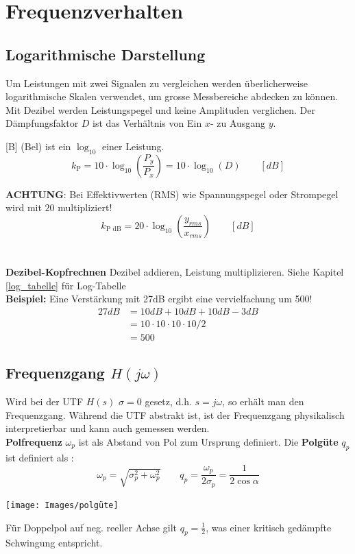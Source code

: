 \section{Frequenzverhalten}
\subsection{Logarithmische Darstellung}
Um Leistungen mit zwei Signalen zu vergleichen werden überlicherweise logarithmische Skalen verwendet, um grosse Messbereiche abdecken zu können. Mit Dezibel werden Leistungspegel und keine Amplituden verglichen. Der Dämpfungsfaktor $D$ ist das Verhältnis von Ein $x$- zu Ausgang $y$.

[B] (Bel) ist ein $\log_{10}$ einer Leistung.
\[k_{\text{P}} = 10 \cdot \log_{10}\left(\frac{P_y}{P_x}\right) = 10 \cdot \log_{10}(D) \qquad [dB]\]

\textbf{ACHTUNG}: Bei Effektivwerten (RMS) wie Spannungspegel oder Strompegel wird mit $20$ multipliziert!
\[k_{\text{P dB}} = 20 \cdot \log_{10}\left(\frac{y_{rms}}{x_{rms}}\right) \qquad [dB]\]
~\\~\\
\textbf{Dezibel-Kopfrechnen}
Dezibel addieren, Leistung multiplizieren. Siehe Kapitel \ref{log_tabelle} für Log-Tabelle
~\\

\noindent\textbf{Beispiel:} Eine Verstärkung mit 27dB ergibt eine vervielfachung um 500!
\begin{align*}
	27dB &= 10dB + 10dB +10dB - 3dB \\
	&= 10 \cdot 10 \cdot 10 \cdot 10 / 2 \\
	&= 500
\end{align*}

\subsection{Frequenzgang $H(j\omega)$}\label{frequenzgang}
Wird bei der UTF $H(s)$ $\sigma = 0$ gesetz, d.h. $s=j\omega$, so erhält man den Frequenzgang. Während die UTF abstrakt ist, ist der Frequenzgang physikalisch interpretierbar und kann auch gemessen werden.
~\\
\noindent\textbf{Polfrequenz} $\omega_p$ ist als Abstand von Pol zum Ursprung definiert. Die \textbf{Polgüte} $q_p$ ist definiert als :
\[
\omega_p = \sqrt{\sigma_{p}^2 + \omega_p^2} \qquad q_p = \frac{\omega_p}{2\sigma_{p}} = \frac{1}{2\cos\alpha}
\]
\begin{center}
	\texttt{[image: Images/polgüte]}
\end{center}
Für Doppelpol auf neg. reeller Achse gilt $q_p = \frac{1}{2}$, was einer kritisch gedämpfte Schwingung entspricht.

